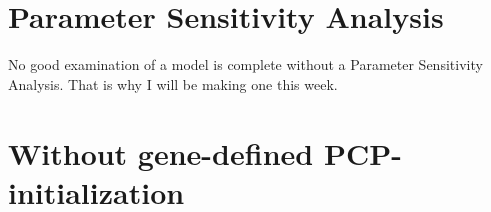 
\section{Parameter Sensitivity Analysis}
No good examination of a model is complete without a Parameter Sensitivity Analysis. That is why I will be making one this week.

\section{Without gene-defined PCP-initialization}



